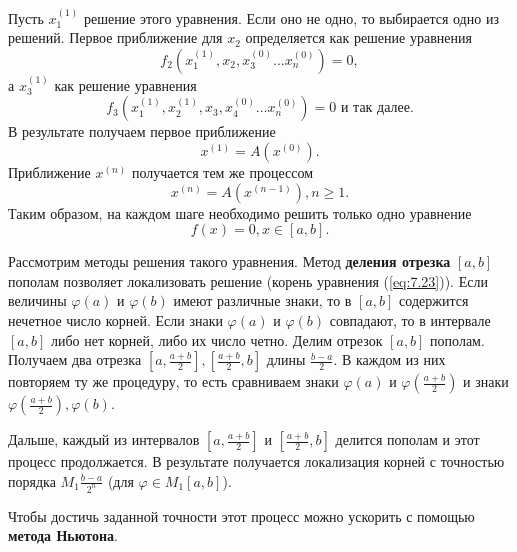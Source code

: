 Пусть $x_1^{(1)}$ решение этого уравнения. Если оно не одно, то выбирается одно из решений. Первое приближение для $x_2$ определяется как решение уравнения
\begin{equation} \label{eq:7.19}
	f_2(x_1^{(1)}, x_2, x_3^{(0)} \dots x_n^{(0)}) = 0,
\end{equation} 
а $x_3^{(1)}$ как решение уравнения
\begin{equation} \label{eq:7.20}
	f_3(x_1^{(1)}, x_2^{(1)}, x_3, x_4^{(0)} \dots x_n^{(0)}) = 0 \textrm{ и так далее}.
\end{equation} 
В результате получаем первое приближение
\begin{equation} \label{eq:7.21}
	x^{(1)} = A(x^{(0)}).
\end{equation} 
Приближение $x^{(n)}$ получается тем же процессом
\begin{equation} \label{eq:7.22}
	x^{(n)} = A(x^{(n-1)}), n \geq 1.
\end{equation} 
Таким образом, на каждом шаге необходимо решить только одно уравнение
\begin{equation} \label{eq:7.23}
	f(x) = 0, x \in [a, b].
\end{equation} 

Рассмотрим методы решения такого уравнения. Метод \textbf{деления отрезка} $[a, b]$ пополам позволяет локализовать решение (корень уравнения (\ref{eq:7.23})). Если величины $\varphi(a)$ и $\varphi(b)$ имеют различные знаки, то в $[a, b]$ содержится нечетное число корней. Если знаки $\varphi(a)$ и $\varphi(b)$ совпадают, то в интервале $[a, b]$ либо нет корней, либо их число четно. Делим отрезок $[a, b]$ пополам. Получаем два отрезка $[a, \frac{a+b}{2}], [\frac{a+b}{2}, b]$ длины $\frac{b-a}{2}$. В каждом из них повторяем ту же процедуру, то есть сравниваем знаки $\varphi(a)$ и $\varphi(\frac{a+b}{2})$ и знаки $\varphi(\frac{a+b}{2}), \varphi(b)$.

Дальше, каждый из интервалов $[a, \frac{a+b}{2}]$ и $[\frac{a+b}{2}, b]$ делится пополам и этот процесс продолжается. В результате получается локализация корней с точностью порядка $M_1 \frac{b-a}{2^n}$ (для $\varphi \in M_1[a, b]$). 

Чтобы достичь заданной точности этот процесс можно ускорить с помощью \textbf{метода Ньютона}.

